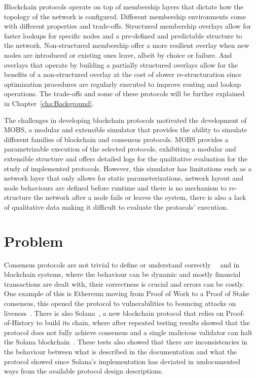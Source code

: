 Blockchain protocols operate on top of membership layers that dictate how the topology of the network is configured.
Different membership environments come with different properties and trade-offs. Structured membership overlays allow for faster lookups for
specific nodes and a pre-defined and predictable structure to the network. Non-structured membership offer a more resilient overlay when
new nodes are introduced or existing ones leave, albeit by choice or failure. And overlays that operate by building a partially structured
overlays allow for the benefits of a non-structured overlay at the cost of slower re-structuration since optimization
procedures are regularly executed to improve routing and lookup operations. The trade-offs and some of these protocols will be further
explained in Chapter~\ref{cha:Background}.

The challenges in developing blockchain protocols motivated the development of MOBS, a modular and extensible simulator that provides
the ability to simulate different families of blockchain and consensus protocols.
MOBS provides a parametrizable execution of the selected protocols, exhibiting a modular and extensible structure and offers detailed logs for the
qualitative evaluation for the study of implemented protocols. However, this simulator has limitations such as a network layer
that only allows for static parameterizations, network layout and node behaviours are defined before runtime and there is no mechanism to
re-structure the network after a node fails or leaves the system, there is also a lack of qualitative data making it difficult to
evaluate the protocols' execution.

\section{Problem}\label{sub:problem}
Consensus protocols are not trivial to define or understand correctly~\cite{paxos}~\cite{have_we_reached_consensus}
and in blockchain systems, where the behaviour can be dynamic and mostly 
financial transactions are dealt with, their correctness is crucial and errors can be costly. One example of this is Ethereum moving from 
Proof of Work to a Proof of Stake consensus, this opened the protocol to vulnerabilities to bouncing attacks on liveness~\cite{ethereum_analysis}.
There is also Solana~\cite{solana}, a new blockchain protocol that relies on Proof-of-History to build its chain,
where after repeated testing results showed that the protocol does not fully achieve consensus and
a single malicious validator can halt the Solana blockchain~\cite{solana_halting_problem}. These tests also showed that there are
inconsistencies in the behaviour between what is described in the documentation and what the protocol showed since Solana's implementation
has deviated in undocumented ways from the available protocol design descriptions.

